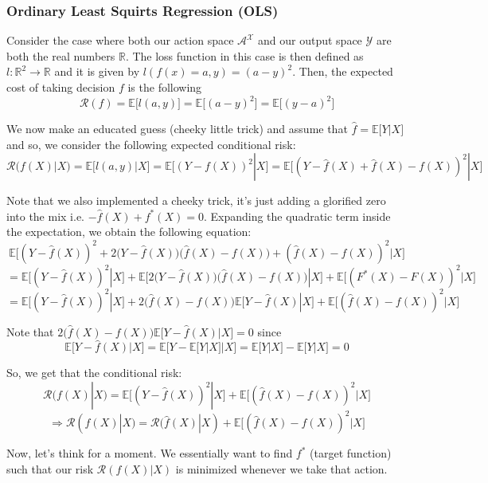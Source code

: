 \subsubsection{Ordinary Least Squirts Regression (OLS)}
Consider the case where both our action space $\mathcal{A}^{\mathcal{X}}$ and our output space $\mathcal{Y}$ are both the real numbers $\mathbb{R}$. The loss function in this case is then defined as $l:\mathbb{R}^2 \rightarrow \mathbb{R}$ and it is given by $l(f(x)=a,y)=(a-y)^2$. Then, the expected cost of taking decision $f$
is the following $$\mathcal{R}(f) = \mathbb{E}\big[l(a,y)\big] = \mathbb{E}\big[(a-y)^2\big] = \mathbb{E}\big[(y-a)^2\big]$$ 

We now make an educated guess (cheeky little trick) and assume that $\hat{f} = \mathbb{E}\big[Y|X\big]$ and so, we consider the following expected conditional risk:
$$\mathcal{R}(f(X)|X) = \mathbb{E}\big[l(a,y)|X\big] = \mathbb{E}\big[(Y-f(X))^2|X\big] = \mathbb{E}\big[(Y-\hat{f}(X)+\hat{f}(X)-f(X))^2|X\big]$$ 

Note that we also implemented a cheeky trick, it's just adding a glorified zero into the mix i.e. $-\hat{f}(X)+f^*(X) = 0$. Expanding the quadratic term inside the expectation, we obtain the following equation:
$$\mathbb{E}\big[(Y-\hat{f}(X))^2 + 2\big(Y-\hat{f}(X)\big)\big(\hat{f}(X)-f(X)\big) + (\hat{f}(X)-f(X))^2 | X\big]$$
$$= \mathbb{E}\big[(Y-\hat{f}(X))^2 | X\big] + \mathbb{E}\big[2\big(Y-\hat{f}(X)\big)\big(\hat{f}(X)-f(X)\big) | X\big] + \mathbb{E}\big[(F^*(X)-F(X))^2 | X\big]$$
$$= \mathbb{E}\big[(Y-\hat{f}(X))^2 | X\big] + 2\big(\hat{f}(X)-f(X)\big) \mathbb{E}\big[Y-\hat{f}(X) | X\big] + \mathbb{E}\big[(\hat{f}(X)-f(X))^2 | X\big]$$

\begin{remark}
    Note that $2\big(\hat{f}(X)-f(X)\big) \mathbb{E}\big[Y-\hat{f}(X) | X\big] = 0$ since $$\mathbb{E}\big[Y-\hat{f}(X) | X\big]=\mathbb{E}\big[Y-\mathbb{E}\big[Y|X\big] | X\big] = \mathbb{E}\big[Y|X\big] - \mathbb{E}\big[Y|X\big] = 0$$
\end{remark}

So, we get that the conditional risk:
$$\mathcal{R}(f(X)|X) = \mathbb{E}\big[(Y-\hat{f}(X))^2 | X\big] + \mathbb{E}\big[(\hat{f}(X)-f(X))^2 | X\big]$$
$$\Rightarrow \mathcal{R}(f(X)|X) = \mathcal{R}(\hat{f}(X)|X) + \mathbb{E}\big[(\hat{f}(X)-f(X))^2 | X\big]$$

Now, let's think for a moment. We essentially want to find $f^*$ (target function) such that our risk $\mathcal{R}(f(X)|X)$ is minimized whenever we take that action. 


